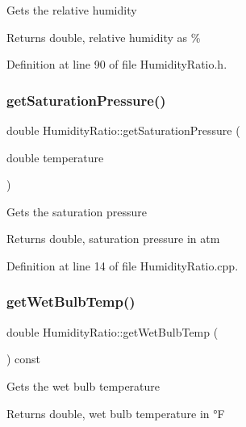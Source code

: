 Gets the relative humidity

\begin{DoxyReturn}{Returns}
double, relative humidity as \% 
\end{DoxyReturn}


Definition at line 90 of file Humidity\+Ratio.\+h.

\mbox{\label{class_humidity_ratio_a29d3152c2f14fd47f9ee34c0787049cf}} 
\subsubsection{\texorpdfstring{get\+Saturation\+Pressure()}{getSaturationPressure()}}
{\footnotesize\ttfamily double Humidity\+Ratio\+::get\+Saturation\+Pressure (\begin{DoxyParamCaption}\item[{double}]{temperature }\end{DoxyParamCaption})}

Gets the saturation pressure

\begin{DoxyReturn}{Returns}
double, saturation pressure in atm 
\end{DoxyReturn}


Definition at line 14 of file Humidity\+Ratio.\+cpp.

\mbox{\label{class_humidity_ratio_adbadf93878e4867ce283319859d04087}} 
\subsubsection{\texorpdfstring{get\+Wet\+Bulb\+Temp()}{getWetBulbTemp()}}
{\footnotesize\ttfamily double Humidity\+Ratio\+::get\+Wet\+Bulb\+Temp (\begin{DoxyParamCaption}{ }\end{DoxyParamCaption}) const\hspace{0.3cm}{\ttfamily [inline]}}

Gets the wet bulb temperature

\begin{DoxyReturn}{Returns}
double, wet bulb temperature in °F 
\end{DoxyReturn}


